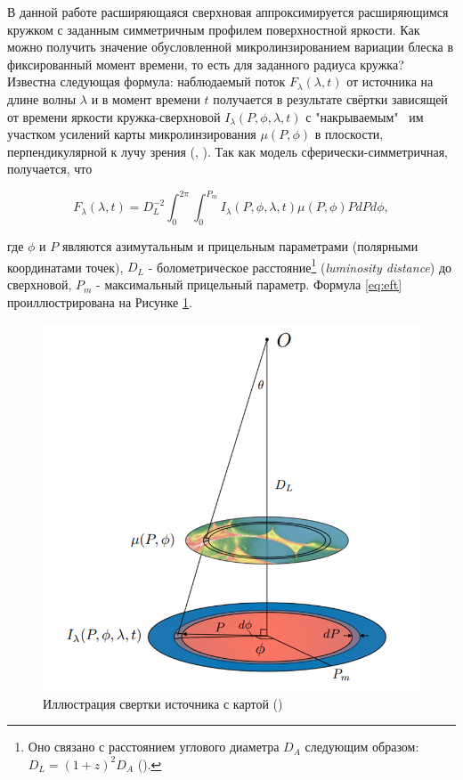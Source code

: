 В данной работе расширяющаяся сверхновая аппроксимируется расширяющимся кружком с заданным симметричным профилем поверхностной яркости. Как можно получить значение обусловленной микролинзированием вариации блеска в фиксированный момент времени, то есть для заданного радиуса кружка? Известна следующая формула: наблюдаемый поток $F_{\lambda}(\lambda,t)$ от источника на длине волны $\lambda$ и в момент времени $t$ получается в результате свёртки зависящей от времени яркости кружка-сверхновой $I_{\lambda}(P,\phi,\lambda, t)$ с "накрываемым" \ им участком усилений карты микролинзирования $\mu(P,\phi)$ в плоскости, перпендикулярной к лучу зрения (\cite{goldstein2018}, \cite{hubersuyu2019}). Так как модель сферически-симметричная, получается, что

\begin{equation}\label{eq:eft}
F_{\lambda}(\lambda,t) = D_L^{-2} \int_0^{2\pi} \int_0^{P_m} I_{\lambda}(P,\phi,\lambda, t) \mu(P,\phi)P dP d\phi,
\end{equation}

\noindent где $\phi$ и $P$ являются азимутальным и прицельным параметрами (полярными координатами точек), $D_L$ - болометрическое расстояние\footnote{Оно связано с расстоянием углового диаметра $D_A$ следующим образом: $D_L = (1+z)^2 D_A$ (\cite{distance_measures}).} (\textit{luminosity distance}) до сверхновой, $P_m$ - максимальный прицельный параметр. Формула \eqref{eq:eft} проиллюстрирована на Рисунке \ref{fig:goldsteinn}. 

\begin{figure}
    \centering
	\includegraphics[scale=0.77]{microlensing/images/goldstein.png}
	\caption{Иллюстрация свертки источника с картой (\cite{goldstein2018})} 
	 \label{fig:goldsteinn}
\end{figure}


